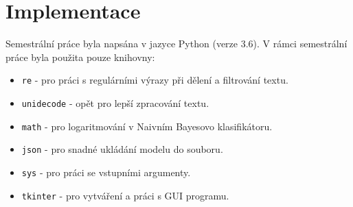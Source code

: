 \documentclass[
12pt,
a4paper,
pdftex,
czech,
titlepage
]{report}
\begin{document}
\chapter{Implementace}
Semestrální práce byla napsána v jazyce Python (verze 3.6). V rámci semestrální práce byla použita pouze knihovny:
\begin{itemize}
\item{\texttt{re} - pro práci s regulárními výrazy při dělení a filtrování textu.}
\item{\texttt{unidecode} - opět pro lepší zpracování textu.}
\item{\texttt{math} - pro logaritmování v Naivním Bayesovo klasifikátoru.}
\item{\texttt{json} - pro snadné ukládání modelu do souboru.}
\item{\texttt{sys} - pro práci se vstupními argumenty.}
\item{\texttt{tkinter} - pro vytváření a práci s GUI programu.}
\end{itemize}
\end{document}
